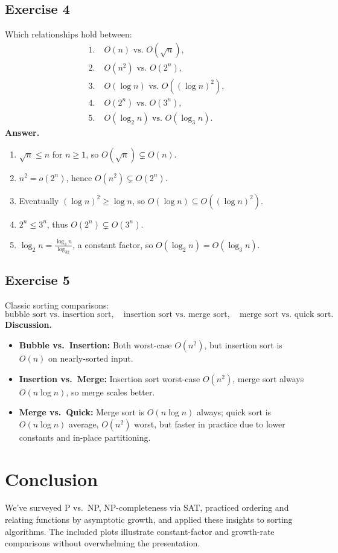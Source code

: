 \documentclass[12pt]{article}
\begin{document}
\subsection{Exercise 4}
Which relationships hold between:
\[
\begin{aligned}
1.\;&O(n)\text{ vs.\ }O(\sqrt n),\\
2.\;&O(n^2)\text{ vs.\ }O(2^n),\\
3.\;&O(\log n)\text{ vs.\ }O((\log n)^2),\\
4.\;&O(2^n)\text{ vs.\ }O(3^n),\\
5.\;&O(\log_2n)\text{ vs.\ }O(\log_3n).
\end{aligned}
\]
\textbf{Answer.}
\begin{enumerate}[label=\arabic*.]
  \item \(\sqrt n\le n\) for \(n\ge1\), so \(O(\sqrt n)\subsetneq O(n)\).
  \item \(n^2=o(2^n)\), hence \(O(n^2)\subsetneq O(2^n)\).
  \item Eventually \((\log n)^2\ge\log n\), so \(O(\log n)\subseteq O((\log n)^2)\).
  \item \(2^n\le3^n\), thus \(O(2^n)\subsetneq O(3^n)\).
  \item \(\log_2n=\tfrac{\log_3n}{\log_32}\), a constant factor, so \(O(\log_2n)=O(\log_3n)\).
\end{enumerate}

\subsection{Exercise 5}
Classic sorting comparisons:
\[
\text{bubble sort vs.\ insertion sort},\quad
\text{insertion sort vs.\ merge sort},\quad
\text{merge sort vs.\ quick sort}.
\]
\textbf{Discussion.}
\begin{itemize}
  \item \textbf{Bubble vs.\ Insertion:} Both worst-case \(O(n^2)\), but insertion sort is \(O(n)\) on nearly-sorted input.
  \item \textbf{Insertion vs.\ Merge:} Insertion sort worst-case \(O(n^2)\), merge sort always \(O(n\log n)\), so merge scales better.
  \item \textbf{Merge vs.\ Quick:} Merge sort is \(O(n\log n)\) always; quick sort is \(O(n\log n)\) average, \(O(n^2)\) worst, but faster in practice due to lower constants and in-place partitioning.
\end{itemize}

\section{Conclusion}
We’ve surveyed P vs.\ NP, NP-completeness via SAT, practiced ordering and relating functions by asymptotic growth, and applied these insights to sorting algorithms. The included plots illustrate constant-factor and growth-rate comparisons without overwhelming the presentation.
\end{document}
